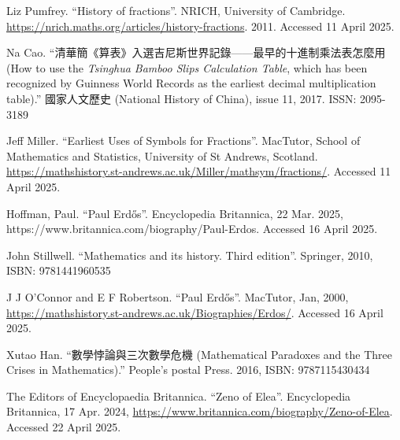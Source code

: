 Liz Pumfrey. ``History of fractions''. NRICH, University of Cambridge. \url{https://nrich.maths.org/articles/history-fractions}. 2011. Accessed 11 April 2025.

Na Cao. ``清華簡《算表》入選吉尼斯世界記錄——最早的十進制乘法表怎麼用 (How to use the \emph{Tsinghua Bamboo Slips Calculation Table}, which has been recognized by Guinness World Records as the earliest decimal multiplication table).'' 國家人文歷史 (National History of China), issue 11, 2017. ISSN: 2095-3189

Jeff Miller. ``Earliest Uses of Symbols for Fractions''. MacTutor, School of Mathematics and Statistics, University of St Andrews, Scotland. \url{https://mathshistory.st-andrews.ac.uk/Miller/mathsym/fractions/}. Accessed 11 April 2025.

Hoffman, Paul. ``Paul Erdős''. Encyclopedia Britannica, 22 Mar. 2025, https://www.britannica.com/biography/Paul-Erdos. Accessed 16 April 2025.

John Stillwell. ``Mathematics and its history. Third edition''. Springer, 2010, ISBN: 9781441960535

J J O'Connor and E F Robertson. ``Paul Erdős''. MacTutor, Jan, 2000, \url{https://mathshistory.st-andrews.ac.uk/Biographies/Erdos/}. Accessed 16 April 2025.

Xutao Han. ``數學悖論與三次數學危機 (Mathematical Paradoxes and the Three Crises in Mathematics).'' People's postal Press. 2016, ISBN: 9787115430434

The Editors of Encyclopaedia Britannica. ``Zeno of Elea''. Encyclopedia Britannica, 17 Apr. 2024, \url{https://www.britannica.com/biography/Zeno-of-Elea}. Accessed 22 April 2025.

